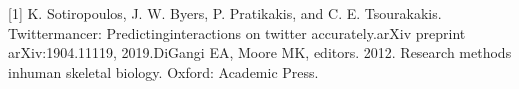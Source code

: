 \documentclass[12pt,oneside]{book}
\begin{document}
% 

%





\tableofcontents
\listoffigures




\mainmatter





%





 
[1] K. Sotiropoulos, J. W. Byers, P. Pratikakis, and C. E. Tsourakakis. Twittermancer: Predictinginteractions on twitter accurately.arXiv preprint arXiv:1904.11119, 2019.\newline
[2] DiGangi EA, Moore MK, editors. 2012. Research methods inhuman skeletal biology. Oxford: Academic Press.

%
%
\end{document}
